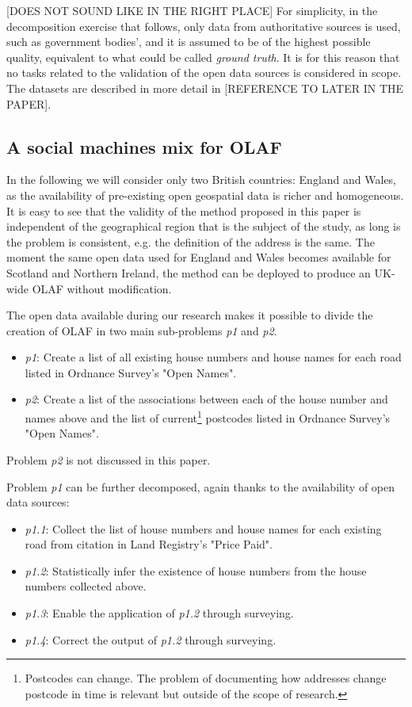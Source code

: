     [DOES NOT SOUND LIKE IN THE RIGHT PLACE] For simplicity, in the decomposition exercise that follows, only data from authoritative sources is used, such as government bodies', and it is assumed to be of the highest possible quality, equivalent to what could be called {\it ground truth}. It is for this reason that no tasks related to the validation of the open data sources is considered in scope. The datasets are described in more detail in [REFERENCE TO LATER IN THE PAPER].
    
\subsection{A social machines mix for OLAF}

    In the following we will consider only two British countries: England and Wales, as the availability of pre-existing open geospatial data is richer and homogeneous. It is easy to see that the validity of the method proposed in this paper is independent of the geographical region that is the subject of the study, as long is the problem is consistent, e.g. the definition of the address is the same. The moment the same open data used for England and Wales becomes available for Scotland and Northern Ireland, the method can be deployed to produce an UK-wide OLAF without modification.
    
    The open data available during our research makes it possible to divide the creation of OLAF in two main sub-problems {\it p1} and {\it p2}. 
    
    \begin{itemize}
        \item {\it p1}: Create a list of all existing house numbers and house names for each road listed in Ordnance Survey's "Open Names".
        \item {\it p2}: Create a list of the associations between each of the house number and names above and the list of current\footnote{Postcodes can change. The problem of documenting how addresses change postcode in time is relevant but outside of the scope of research.} postcodes listed in Ordnance Survey's "Open Names". 
    \end{itemize}

    Problem {\it p2} is not discussed in this paper. 
    
    Problem {\it p1} can be further decomposed, again thanks to the availability of open data sources:
    
    \begin{itemize}
        \item {\it p1.1}: Collect the list of house numbers and house names for each existing road from citation in Land Registry's "Price Paid".
        \item {\it p1.2}: Statistically infer the existence of house numbers from the house numbers collected above.
        \item {\it p1.3}: Enable the application of {\it p1.2} through surveying.
        \item {\it p1.4}: Correct the output of {\it p1.2} through surveying.
    \end{itemize}

